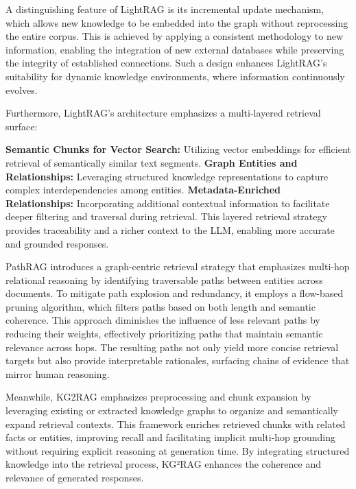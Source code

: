 \documentclass[12pt,twoside]{report}
\begin{document}
A distinguishing feature of LightRAG is its incremental update mechanism, which allows new knowledge to be embedded into the graph without reprocessing the entire corpus. This is achieved by applying a consistent methodology to new information, enabling the integration of new external databases while preserving the integrity of established connections. Such a design enhances LightRAG's suitability for dynamic knowledge environments, where information continuously evolves.

Furthermore, LightRAG's architecture emphasizes a multi-layered retrieval surface:

\textbf{Semantic Chunks for Vector Search:} Utilizing vector embeddings for efficient retrieval of semantically similar text segments. \textbf{Graph Entities and Relationships:} Leveraging structured knowledge representations to capture complex interdependencies among entities. \textbf{Metadata-Enriched Relationships:} Incorporating additional contextual information to facilitate deeper filtering and traversal during retrieval. This layered retrieval strategy provides traceability and a richer context to the LLM, enabling more accurate and grounded responses.


PathRAG\cite{PathRAG} introduces a graph-centric retrieval strategy that emphasizes multi-hop relational reasoning by identifying traversable paths between entities across documents. To mitigate path explosion and redundancy, it employs a flow-based pruning algorithm, which filters paths based on both length and semantic coherence. This approach diminishes the influence of less relevant paths by reducing their weights, effectively prioritizing paths that maintain semantic relevance across hops. The resulting paths not only yield more concise retrieval targets but also provide interpretable rationales, surfacing chains of evidence that mirror human reasoning.


Meanwhile, KG2RAG \cite{KG2RAG} emphasizes preprocessing and chunk expansion by leveraging existing or extracted knowledge graphs to organize and semantically expand retrieval contexts. This framework enriches retrieved chunks with related facts or entities, improving recall and facilitating implicit multi-hop grounding without requiring explicit reasoning at generation time. By integrating structured knowledge into the retrieval process, KG²RAG enhances the coherence and relevance of generated responses.
\end{document}
